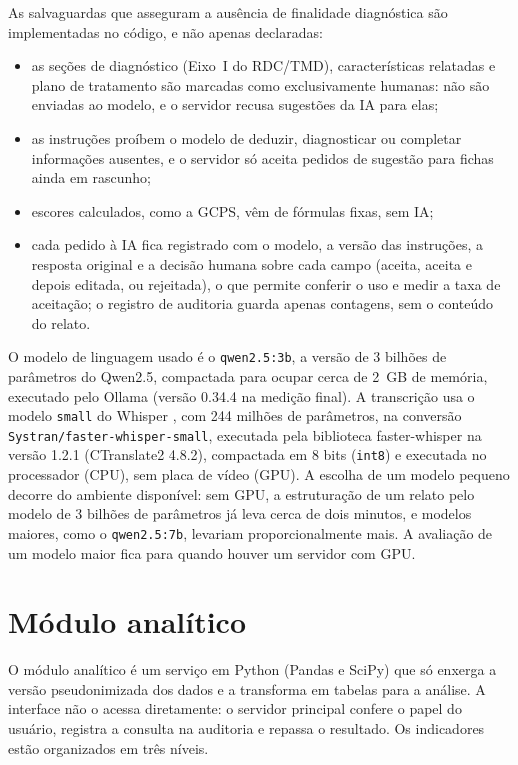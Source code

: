 As salvaguardas que asseguram a ausência de finalidade diagnóstica são implementadas no código, e não apenas declaradas:

\begin{itemize}
	\item as seções de diagnóstico (Eixo~I do RDC/TMD), características relatadas e plano de tratamento são marcadas como exclusivamente humanas: não são enviadas ao modelo, e o servidor recusa sugestões da IA para elas;
	\item as instruções proíbem o modelo de deduzir, diagnosticar ou completar informações ausentes, e o servidor só aceita pedidos de sugestão para fichas ainda em rascunho;
	\item escores calculados, como a GCPS, vêm de fórmulas fixas, sem IA;
	\item cada pedido à IA fica registrado com o modelo, a versão das instruções, a resposta original e a decisão humana sobre cada campo (aceita, aceita e depois editada, ou rejeitada), o que permite conferir o uso e medir a taxa de aceitação; o registro de auditoria guarda apenas contagens, sem o conteúdo do relato.
\end{itemize}

O modelo de linguagem usado é o \texttt{qwen2.5:3b}, a versão de 3 bilhões de parâmetros do Qwen2.5, compactada para ocupar cerca de 2~GB de memória, executado pelo Ollama (versão 0.34.4 na medição final). A transcrição usa o modelo \texttt{small} do Whisper \cite{radford2023}, com 244 milhões de parâmetros, na conversão \texttt{Systran/faster-whisper-small}, executada pela biblioteca faster-whisper \cite{fasterwhisper} na versão 1.2.1 (CTranslate2 4.8.2), compactada em 8 bits (\texttt{int8}) e executada no processador (CPU), sem placa de vídeo (GPU). A escolha de um modelo pequeno decorre do ambiente disponível: sem GPU, a estruturação de um relato pelo modelo de 3 bilhões de parâmetros já leva cerca de dois minutos, e modelos maiores, como o \texttt{qwen2.5:7b}, levariam proporcionalmente mais. A avaliação de um modelo maior fica para quando houver um servidor com GPU.

\section{Módulo analítico}
\label{sec:metodo-analitico}

O módulo analítico é um serviço em Python (Pandas e SciPy) que só enxerga a versão pseudonimizada dos dados e a transforma em tabelas para a análise. A interface não o acessa diretamente: o servidor principal confere o papel do usuário, registra a consulta na auditoria e repassa o resultado. Os indicadores estão organizados em três níveis.

